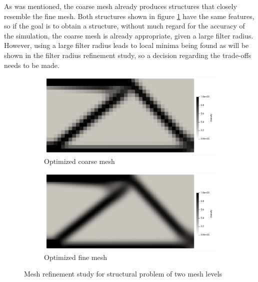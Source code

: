As was mentioned, the coarse mesh already produces structures that closely resemble the fine mesh. Both structures shown in figure \ref{fig:mesh_refinement_structural} have the same features, so if the goal is to obtain a structure, without much regard for the accuracy of the simulation, the coarse mesh is already appropriate, given a large filter radius. However, using a large filter radius leads to local minima being found as will be shown in the filter radius refinement study, so a decision regarding the trade-offs needs to be made. 
\begin{figure}[ht]
  \centering
  \hfill
  \begin{subfigure}[b]{0.4\linewidth}
      \includegraphics[width=\linewidth]{figures/chapter_4/MeshRefinementCoarse.png}
      \caption{Optimized coarse mesh}
  \end{subfigure}
  \hfill
  \begin{subfigure}[b]{0.4\linewidth}
      \includegraphics[width=\linewidth]{figures/chapter_4/MeshRefinementFine.png}
      \caption{Optimized fine mesh}
  \end{subfigure}
  \hfill
  \caption{Mesh refinement study for structural problem of two mesh levels}
  \label{fig:mesh_refinement_structural}
\end{figure}

